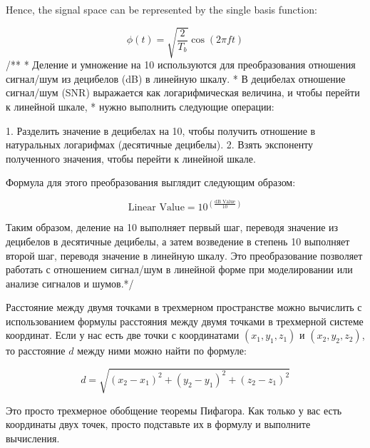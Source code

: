 \documentclass[14pt, a4paper]{extarticle}
\begin{document}
Hence, the signal space can be represented by the single basis function:

\[
\phi(t) = \sqrt{\frac{2}{T_{b}}} \cos\left(2\pi ft\right)
\]
\newpage
/**
 * Деление и умножение на 10 используются для преобразования отношения сигнал/шум из децибелов (dB) в линейную шкалу.
 * В децибелах отношение сигнал/шум (SNR) выражается как логарифмическая величина, и чтобы перейти к линейной шкале,
 * нужно выполнить следующие операции:

1. Разделить значение в децибелах на 10, чтобы получить отношение в натуральных логарифмах (десятичные децибелы).
2. Взять экспоненту полученного значения, чтобы перейти к линейной шкале.

Формула для этого преобразования выглядит следующим образом:

\[ \text{Linear Value} = 10^{\left(\frac{\text{dB Value}}{10}\right)} \]

Таким образом, деление на 10 выполняет первый шаг, переводя значение из децибелов в десятичные децибелы,
 а затем возведение в степень 10 выполняет второй шаг, переводя значение в линейную шкалу.
 Это преобразование позволяет работать с отношением сигнал/шум в линейной форме при моделировании или анализе сигналов и шумов.*/

\newpage

Расстояние между двумя точками в трехмерном пространстве можно вычислить с использованием формулы расстояния между двумя точками в трехмерной системе координат. Если у нас есть две точки с координатами \((x_1, y_1, z_1)\) и \((x_2, y_2, z_2)\), то расстояние \(d\) между ними можно найти по формуле:

\[ d = \sqrt{(x_2 - x_1)^2 + (y_2 - y_1)^2 + (z_2 - z_1)^2} \]

Это просто трехмерное обобщение теоремы Пифагора. Как только у вас есть координаты двух точек, просто подставьте их в формулу и выполните вычисления.
  
\end{document}
